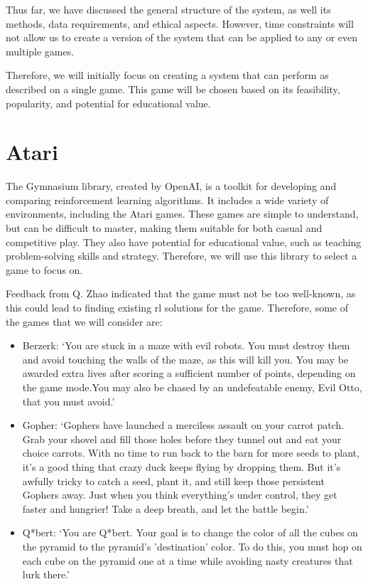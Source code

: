 Thus far, we have discussed the general structure of the system, as well its
methods, data requirements, and ethical aspects. However, time constraints 
will not allow us to create a version of the system that can be applied to
any or even multiple games.

Therefore, we will initially focus on creating a system that can perform
as described on a single game. This game will be chosen based on its
feasibility, popularity, and potential for educational value.

\section{Atari}\label{sec:environment-setup-atari}
The Gymnasium library, created by OpenAI, is a toolkit for developing and
comparing reinforcement learning algorithms. It includes a wide variety of
environments, including the Atari games. These games are simple to understand,
but can be difficult to master, making them suitable for both casual and
competitive play. They also have potential for educational value, such as
teaching problem-solving skills and strategy. Therefore, we will use this
library to select a game to focus on. 

Feedback from Q. Zhao indicated that the game must not be too well-known, as
this could lead to finding existing \gls{rl} solutions for the game. Therefore,
some of the games that we will consider are:

\begin{itemize}
    \item Berzerk: `You are stuck in a maze with evil robots. You must destroy
        them and avoid touching the walls of the maze, as this will kill you.
        You may be awarded extra lives after scoring a sufficient number of
        points, depending on the game mode.You may also be chased by an
        undefeatable enemy, Evil Otto, that you must avoid.'\cite{berzerk-gym}
    \item Gopher: `Gophers have launched a merciless assault on your carrot
        patch. Grab your shovel and fill those holes before they tunnel out and
        eat your choice carrots. With no time to run back to the barn for more
        seeds to plant, it's a good thing that crazy duck keeps flying by
        dropping them. But it's awfully tricky to catch a seed, plant it, and
        still keep those persistent Gophers away. Just when you think
        everything's under control, they get faster and hungrier! Take a deep
        breath, and let the battle begin.'\cite{gopher-desc}\cite{gopher-gym}
    \item Q*bert: `You are Q*bert. Your goal is to change the color of all the
        cubes on the pyramid to the pyramid's 'destination' color. To do this,
        you must hop on each cube on the pyramid one at a time while avoiding
        nasty creatures that lurk there.'\cite{qbert-gym}
\end{itemize}

